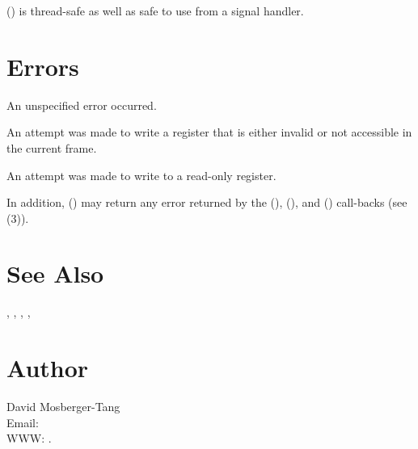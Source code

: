 \documentclass{article}
\begin{document}
() is thread-safe as well as safe to use
from a signal handler.

\section{Errors}

\begin{Description}
\item[\Const{UNW\_EUNSPEC}] An unspecified error occurred.
\item[\Const{UNW\_EBADREG}] An attempt was made to write a register
  that is either invalid or not accessible in the current frame.
\item[\Const{UNW\_EREADONLY}] An attempt was made to write to a
  read-only register.
\end{Description}
In addition, () may return any error returned by
the (), (), and
() call-backs (see
(3)).

\section{See Also}

,
,
,
,

\section{Author}

\noindent
David Mosberger-Tang\\
Email: \\
WWW: .
\LatexManEnd
\end{document}
